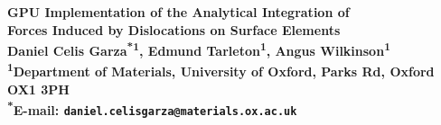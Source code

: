

\begin{flushleft}
	\begin{minipage}{0.9\paperwidth}
		\centering
		{\fontsize{72}{86.4}\color{white}\selectfont\textbf{GPU Implementation of the Analytical Integration of\\ Forces Induced by Dislocations on Surface Elements}}\\[0.8cm]
		{\fontsize{48}{57.6}\color{white}\selectfont\textbf{Daniel Celis Garza\textsuperscript{*1}, Edmund Tarleton\textsuperscript{1}, Angus Wilkinson\textsuperscript{1}}}\\[0.6cm]
		{\fontsize{48}{57.6}\color{white}\selectfont\textbf{\textsuperscript{1}Department of Materials, University of Oxford, Parks Rd, Oxford OX1 3PH}}\\[0.6cm]
		{\fontsize{48}{57.6}\color{white}\selectfont\textbf{\textsuperscript{*}E-mail: \texttt{daniel.celisgarza@materials.ox.ac.uk}}}
	\end{minipage}
\end{flushleft}
\vspace{5cm}
